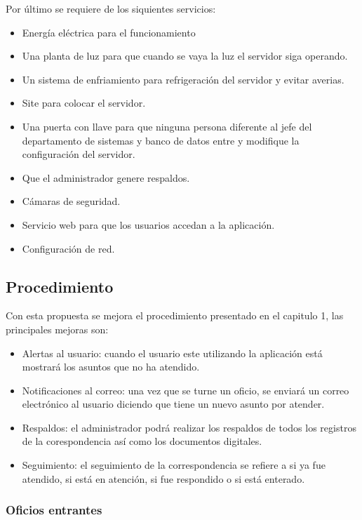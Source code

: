 Por último se requiere de los siquientes servicios: 
\begin{itemize}
	\item Energía eléctrica para el funcionamiento
	\item Una planta de luz para que cuando se vaya la luz el servidor siga operando.
	\item Un sistema de enfriamiento para refrigeración del servidor y evitar averias.
	\item Site para colocar el servidor.
	\item Una puerta con llave para que ninguna persona diferente al jefe del departamento de sistemas y banco de datos entre y modifique la configuración del servidor.
	\item Que el administrador genere respaldos.
	\item Cámaras de seguridad. 
	\item Servicio web para que los usuarios accedan a la aplicación. 
	\item Configuración de red.
\end{itemize} 

\subsection{Procedimiento}
Con esta propuesta se mejora el procedimiento presentado en el capitulo 1, las principales mejoras son:

\begin{itemize}
	\item Alertas al usuario: cuando el usuario este utilizando la aplicación está mostrará los asuntos que no ha atendido. 
	\item Notificaciones al correo: una vez que se turne un oficio, se enviará un correo electrónico al usuario diciendo que tiene un nuevo asunto por atender. 
	\item Respaldos: el administrador podrá realizar los respaldos de todos los registros de la corespondencia así como los documentos digitales.
	\item Seguimiento: el seguimiento de la correspondencia se refiere a si ya fue atendido, si está en atención, si fue respondido o si está enterado.
\end{itemize}

\subsubsection{Oficios entrantes}

